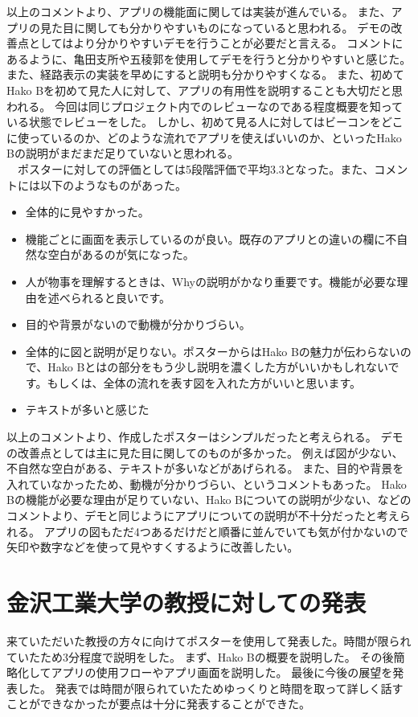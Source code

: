 \documentclass[openany,11pt,papersize]{jsbook}
\begin{document}
以上のコメントより、アプリの機能面に関しては実装が進んでいる。
また、アプリの見た目に関しても分かりやすいものになっていると思われる。
デモの改善点としてはより分かりやすいデモを行うことが必要だと言える。
コメントにあるように、亀田支所や五稜郭を使用してデモを行うと分かりやすいと感じた。
また、経路表示の実装を早めにすると説明も分かりやすくなる。
また、初めてHako Bを初めて見た人に対して、アプリの有用性を説明することも大切だと思われる。
今回は同じプロジェクト内でのレビューなのである程度概要を知っている状態でレビューをした。
しかし、初めて見る人に対してはビーコンをどこに使っているのか、どのような流れでアプリを使えばいいのか、といったHako Bの説明がまだまだ足りていないと思われる。\\
　ポスターに対しての評価としては5段階評価で平均3.3となった。また、コメントには以下のようなものがあった。
\begin{itemize}

\item 全体的に見やすかった。
\item 機能ごとに画面を表示しているのが良い。既存のアプリとの違いの欄に不自然な空白があるのが気になった。
\item 人が物事を理解するときは、Whyの説明がかなり重要です。機能が必要な理由を述べられると良いです。
\item 目的や背景がないので動機が分かりづらい。
\item 全体的に図と説明が足りない。ポスターからはHako Bの魅力が伝わらないので、Hako Bとはの部分をもう少し説明を濃くした方がいいかもしれないです。もしくは、全体の流れを表す図を入れた方がいいと思います。
\item テキストが多いと感じた

\end{itemize}
以上のコメントより、作成したポスターはシンプルだったと考えられる。
デモの改善点としては主に見た目に関してのものが多かった。
例えば図が少ない、不自然な空白がある、テキストが多いなどがあげられる。
また、目的や背景を入れていなかったため、動機が分かりづらい、というコメントもあった。
Hako Bの機能が必要な理由が足りていない、Hako Bについての説明が少ない、などのコメントより、デモと同じようにアプリについての説明が不十分だったと考えられる。
アプリの図もただ4つあるだけだと順番に並んでいても気が付かないので矢印や数字などを使って見やすくするように改善したい。


\section{金沢工業大学の教授に対しての発表}
来ていただいた教授の方々に向けてポスターを使用して発表した。時間が限られていたため3分程度で説明をした。
まず、Hako Bの概要を説明した。
その後簡略化してアプリの使用フローやアプリ画面を説明した。
最後に今後の展望を発表した。
発表では時間が限られていたためゆっくりと時間を取って詳しく話すことができなかったが要点は十分に発表することができた。
\end{document}
